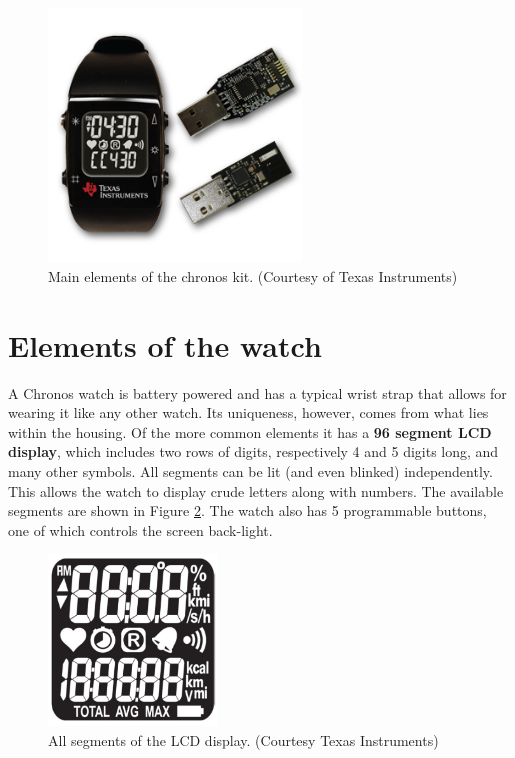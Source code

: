 \begin{figure}[h]
  \centering
  \includegraphics[width=0.6\textwidth]{img/chronos_watch.png}
  \caption{Main elements of the chronos kit. (Courtesy of Texas
  Instruments)}
  \label{fig:chronos_watch}
\end{figure}

\section{Elements of the watch}
A Chronos watch is battery powered and has a typical wrist strap that
allows for wearing it like any other watch. Its uniqueness, however,
comes from what lies within the housing. Of the more common elements
it has a {\bf 96 segment LCD display}, which includes two rows of
digits, respectively 4 and 5 digits long, and many other symbols. All
segments can be lit (and even blinked) independently.  This allows the
watch to display crude letters along with numbers. The available
segments are shown in Figure \ref{fig:chronos_segs}.  The watch also
has 5 programmable buttons, one of which controls the screen
back-light.

\begin{figure}[h]
  \centering
  \includegraphics[width=0.4\textwidth]{img/chronos_segs.png}
  \caption{All segments of the LCD display. (Courtesy Texas
  Instruments)}
  \label{fig:chronos_segs}
\end{figure}

